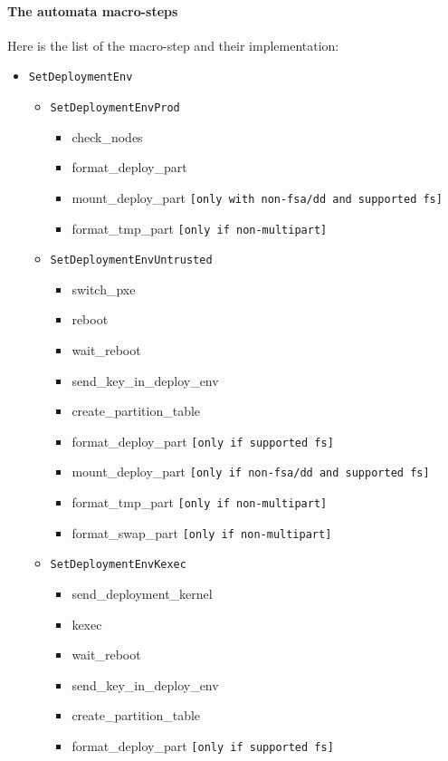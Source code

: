 \documentclass[a4wide,10pt,oneside]{book}
\begin{document}
\paragraph{The automata macro-steps\\\label{sec:macro_desc}}
Here is the list of the macro-step and their implementation:
\begin{itemize}
\item \texttt{SetDeploymentEnv}
  \begin{itemize}
  \item \texttt{SetDeploymentEnvProd}
    \begin{itemize}
    \item check\_nodes
    \item format\_deploy\_part
    \item mount\_deploy\_part \texttt{[only with non-fsa/dd and supported fs]}
    \item format\_tmp\_part \texttt{[only if non-multipart]}
    \end{itemize}
  \item \texttt{SetDeploymentEnvUntrusted}
    \begin{itemize}
    \item switch\_pxe
    \item reboot
    \item wait\_reboot
    \item send\_key\_in\_deploy\_env
    \item create\_partition\_table
    \item format\_deploy\_part \texttt{[only if supported fs]}
    \item mount\_deploy\_part \texttt{[only if non-fsa/dd and supported fs]}
    \item format\_tmp\_part \texttt{[only if non-multipart]}
    \item format\_swap\_part \texttt{[only if non-multipart]}
    \end{itemize}
  \item \texttt{SetDeploymentEnvKexec}
    \begin{itemize}
    \item send\_deployment\_kernel
    \item kexec
    \item wait\_reboot
    \item send\_key\_in\_deploy\_env
    \item create\_partition\_table
    \item format\_deploy\_part \texttt{[only if supported fs]}

\end{itemize}
\end{itemize}
\end{itemize}
\end{document}
